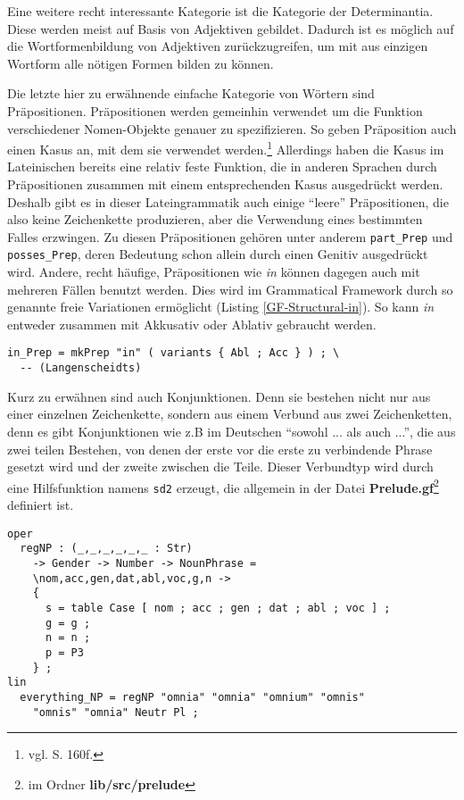 Eine weitere recht interessante Kategorie ist die Kategorie der Determinantia. Diese werden meist auf Basis von Adjektiven gebildet. Dadurch ist es möglich auf die Wortformenbildung von Adjektiven zurückzugreifen, um mit aus einzigen Wortform alle nötigen Formen bilden zu können. \par
Die letzte hier zu erwähnende einfache Kategorie von Wörtern sind Präpositionen. Präpositionen werden gemeinhin verwendet um die Funktion verschiedener Nomen-Objekte genauer zu spezifizieren. So geben Präposition auch einen Kasus an, mit dem sie verwendet werden.\footnote{vgl. \cite{BAYER-LINDAUER1994} S. 160f.} Allerdings haben die Kasus im Lateinischen bereits eine relativ feste Funktion, die in anderen Sprachen durch Präpositionen zusammen mit einem entsprechenden Kasus ausgedrückt werden. Deshalb gibt es in dieser Lateingrammatik auch einige "`leere"' Präpositionen, die also keine Zeichenkette produzieren, aber die Verwendung eines bestimmten Falles erzwingen. Zu diesen Präpositionen gehören unter anderem \texttt{part\_Prep} und \texttt{posses\_Prep}, deren Bedeutung schon allein durch einen Genitiv ausgedrückt wird. Andere, recht häufige, Präpositionen wie \textit{in} können dagegen auch mit mehreren Fällen benutzt werden. Dies wird im Grammatical Framework durch so genannte freie Variationen ermöglicht (Listing \ref{GF-Structural-in}). So kann \textit{in} entweder zusammen mit Akkusativ oder Ablativ gebraucht werden.
\begin{lstlisting}[float=h!tp,label={GF-Structural-in},caption={Beispiel für freie Variation (vgl. \textbf{StructuralLat.gf})}]
in_Prep = mkPrep "in" ( variants { Abl ; Acc } ) ; \
  -- (Langenscheidts)
\end{lstlisting}
Kurz zu erwähnen sind auch Konjunktionen. Denn sie bestehen nicht nur aus einer einzelnen Zeichenkette, sondern aus einem Verbund aus zwei Zeichenketten, denn es gibt Konjunktionen wie z.B im Deutschen ``sowohl ... als auch ...'', die aus zwei teilen Bestehen, von denen der erste vor die erste zu verbindende Phrase gesetzt wird und der zweite zwischen die Teile. Dieser Verbundtyp wird durch eine Hilfsfunktion namens \texttt{sd2} erzeugt, die allgemein in der Datei \textbf{Prelude.gf}\footnote{im Ordner \textbf{lib/src/prelude}} definiert ist. \par
\begin{lstlisting}[float=h!tp,caption={Erzeugung des \texttt{NP}-Objekts für \texttt{everything\_NP} (vgl. \textbf{ResLat.gf} und \textbf{StructuralLat.gf})},label={GF-Structural-Everything},basicstyle=\small]
oper
  regNP : (_,_,_,_,_,_ : Str) 
    -> Gender -> Number -> NounPhrase =
    \nom,acc,gen,dat,abl,voc,g,n ->
    {
      s = table Case [ nom ; acc ; gen ; dat ; abl ; voc ] ;
      g = g ;
      n = n ;
      p = P3 
    } ;
lin
  everything_NP = regNP "omnia" "omnia" "omnium" "omnis" 
    "omnis" "omnia" Neutr Pl ; 
\end{lstlisting}
